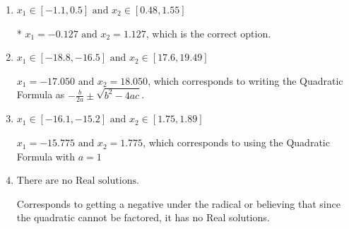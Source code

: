 \documentclass{extbook}[14pt]
\begin{document}
\begin{enumerate}
{\begin{enumerate}[label=\Alph*.]
 $x_1 = -1.127 \text{ and } x_2 = 0.127$, which corresponds to writing the Quadratic Formula as $\frac{b \pm \sqrt{b^2 - 4ac}}{2a}$
\item \( x_1 \in [-1.1, 0.5] \text{ and } x_2 \in [0.48, 1.55] \)

* $x_1 = -0.127 \text{ and } x_2 = 1.127$, which is the correct option.
\item \( x_1 \in [-18.8, -16.5] \text{ and } x_2 \in [17.6, 19.49] \)

 $x_1 = -17.050 \text{ and } x_2 = 18.050$, which corresponds to writing the Quadratic Formula as $-\frac{b}{2a} \pm \sqrt{b^2 - 4ac}$.
\item \( x_1 \in [-16.1, -15.2] \text{ and } x_2 \in [1.75, 1.89] \)

 $x_1 = -15.775 \text{ and } x_2 = 1.775$, which corresponds to using the Quadratic Formula with $a=1$
\item \( \text{There are no Real solutions.} \)

Corresponds to getting a negative under the radical or believing that since the quadratic cannot be factored, it has no Real solutions.
\end{enumerate}

}
\end{enumerate}
\end{document}
